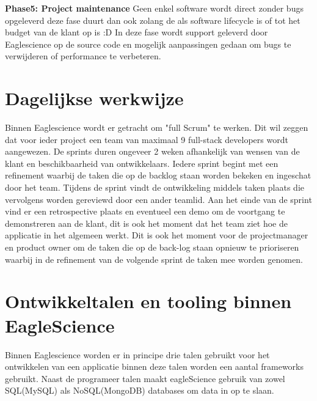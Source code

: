 \textbf{Phase5: Project maintenance}
Geen enkel software wordt direct zonder bugs opgeleverd deze fase duurt dan ook zolang de als software lifecycle is of tot het budget van de klant op is :D In deze fase wordt support geleverd door Eaglescience op de source code en mogelijk aanpassingen gedaan om bugs te verwijderen of performance te verbeteren.

\section{Dagelijkse werkwijze}\label{sec:dagelijkse-werkwijze}
Binnen Eaglescience wordt er getracht om "full Scrum" te werken.
Dit wil zeggen dat voor ieder project een team van maximaal 9 full-stack developers wordt aangewezen.
De sprints duren ongeveer 2 weken afhankelijk van wensen van de klant en beschikbaarheid van ontwikkelaars.
Iedere sprint begint met een refinement waarbij de taken die op de backlog staan worden bekeken en ingeschat door het team.
Tijdens de sprint vindt de ontwikkeling middels taken plaats die vervolgens worden gereviewd door een ander teamlid.
Aan het einde van de sprint vind er een retrospective plaats en eventueel een demo om de voortgang te demonstreren aan de klant, dit is ook het moment dat het team ziet hoe de applicatie in het algemeen werkt.
Dit is ook het moment voor de projectmanager en product owner om de taken die op de back-log staan opnieuw te prioriseren waarbij in de refinement van de volgende sprint de taken mee worden genomen.

\section{Ontwikkeltalen en tooling binnen EagleScience}\label{sec:ontwikkeltalen-en-tooling-binnen-eaglescience}
Binnen Eaglescience worden er in principe drie talen gebruikt voor het ontwikkelen van een applicatie binnen deze talen worden een aantal frameworks gebruikt.
Naast de programeer talen maakt eagleScience gebruik van zowel SQL(MySQL) als NoSQL(MongoDB) databases om data in op te slaan.\\

